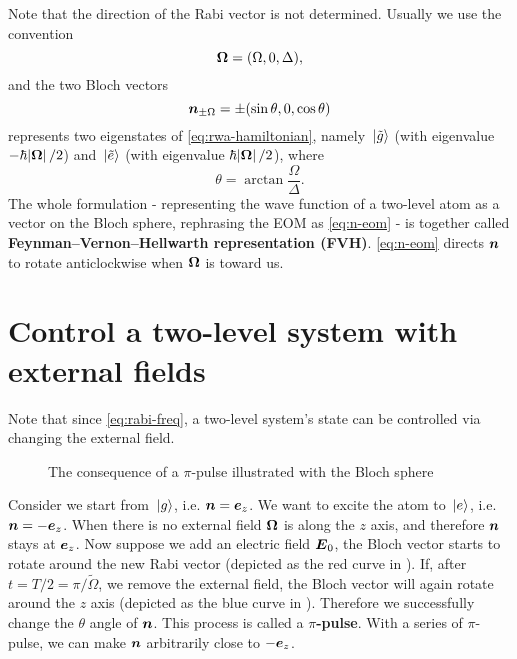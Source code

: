 \documentclass[hyperref, a4paper]{article}
\newcommand*{\concept}[1]{{\textbf{#1}}}
\begin{document}
Note that the direction of the Rabi vector is not determined.
Usually we use the convention
\begin{equation}
    \vb*{\Omega} = (\Omega, 0, \Delta), 
    \label{eq:omega-convention}
\end{equation} 
and the two Bloch vectors
\begin{equation}
    \vb*{n}_{\pm \Omega} = \pm (\sin \theta, 0, \cos \theta)
\end{equation}
represents two eigenstates of \eqref{eq:rwa-hamiltonian}, namely $\ket*{\tilde{g}}$ (with eigenvalue $- \hbar \abs*{\vb*{\Omega}} / 2$) and $\ket*{\tilde{e}}$ (with eigenvalue $\hbar \abs*{\vb*{\Omega}} / 2$), where 
\begin{equation}
    \theta = \arctan \frac{\Omega}{\Delta}.
\end{equation}
The whole formulation - representing the wave function of a two-level atom as a vector on the Bloch sphere, 
rephrasing the EOM as \eqref{eq:n-eom} - is together called \concept{Feynman–Vernon–Hellwarth representation (FVH)}.
\eqref{eq:n-eom} directs $\vb*{n}$ to rotate anticlockwise when $\vb*{\Omega}$ is toward us.

\section{Control a two-level system with external fields}

Note that since \eqref{eq:rabi-freq}, a two-level system's state can be controlled via changing the external field.

\begin{figure}
    \centering
    
    \caption{The consequence of a $\pi$-pulse illustrated with the Bloch sphere}
    \label{fig:pi-pulse-result}
\end{figure}

Consider we start from $\ket*{g}$, i.e. $\vb*{n} = \vb*{e}_z$.
We want to excite the atom to $\ket*{e}$, i.e. $\vb*{n} = - \vb*{e}_z$.
When there is no external field $\vb*{\Omega}$ is along the $z$ axis, and therefore $\vb*{n}$ stays at $\vb*{e}_z$. 
Now suppose we add an electric field $\vb*{E}_0$, the Bloch vector starts to rotate around the new Rabi vector (depicted as the red curve in ).
If, after $t = T/2 = \pi / \tilde{\Omega}$, we remove the external field, the Bloch vector will again rotate around the $z$ axis (depicted as the blue curve in ).
Therefore we successfully change the $\theta$ angle of $\vb*{n}$.
This process is called a \concept{$\pi$-pulse}.
With a series of $\pi$-pulse, we can make $\vb*{n}$ arbitrarily close to $- \vb*{e}_z$.
\end{document}
